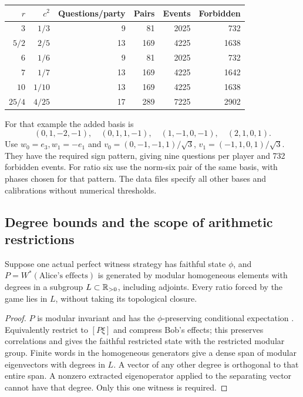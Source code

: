 \begin{center}
\begin{tabular}{rrrrrr}
\toprule
$r$ & $c^2$ & Questions/party & Pairs & Events & Forbidden\\
\midrule
$3$ & $1/3$ & 9 & 81 & 2025 & 732\\
$5/2$ & $2/5$ & 13 & 169 & 4225 & 1638\\
$6$ & $1/6$ & 9 & 81 & 2025 & 732\\
$7$ & $1/7$ & 13 & 169 & 4225 & 1642\\
$10$ & $1/10$ & 13 & 169 & 4225 & 1638\\
$25/4$ & $4/25$ & 17 & 289 & 7225 & 2902\\
\bottomrule
\end{tabular}
\end{center}

For that example the added basis is
\[
 (0,1,-2,-1),\quad(0,1,1,-1),\quad
 (1,-1,0,-1),\quad(2,1,0,1).
\]
Use $w_0=e_3,w_1=-e_1$ and $v_0=(0,-1,-1,1)/\sqrt3$, $v_1=(-1,1,0,1)/\sqrt3$. They have the required sign pattern, giving nine questions per player and 732 forbidden events. For ratio six use the norm-six pair of the same basis, with phases chosen for that pattern. The data files specify all other bases and calibrations without numerical thresholds.

\subsection{Degree bounds and the scope of arithmetic restrictions}
\begin{proposition}\label{prop:degree}
Suppose one actual perfect witness strategy has faithful state $\phi$, and $P=W^*(\text{Alice's effects})$ is generated by modular homogeneous elements with degrees in a subgroup $L\subset\mathbb R_{>0}$, including adjoints. Every ratio forced by the game lies in $L$, without taking its topological closure.
\end{proposition}
\begin{proof}
$P$ is modular invariant and has the $\phi$-preserving conditional expectation \cite{Takesaki}. Equivalently restrict to $[P\xi]$ and compress Bob's effects; this preserves correlations and gives the faithful restricted state with the restricted modular group. Finite words in the homogeneous generators give a dense span of modular eigenvectors with degrees in $L$. A vector of any other degree is orthogonal to that entire span. A nonzero extracted eigenoperator applied to the separating vector cannot have that degree. Only this one witness is required.
\end{proof}

